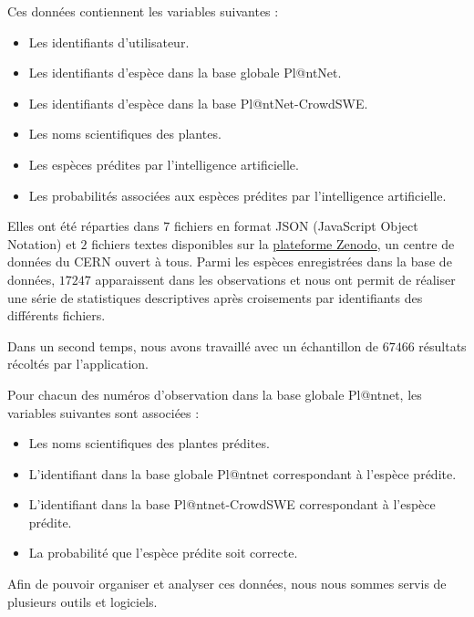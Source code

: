 \documentclass[a4paper,12pt]{article}
\begin{document}
\vspace{0.2cm}

Ces données contiennent les variables suivantes :
\begin{itemize}
    \item Les identifiants d'utilisateur.
    \item Les identifiants d'espèce dans la base globale Pl@ntNet.
    \item Les identifiants d'espèce dans la base Pl@ntNet-CrowdSWE.
    \item Les noms scientifiques des plantes.
    \item Les espèces prédites par l'intelligence artificielle.
    \item Les probabilités associées aux espèces prédites par l'intelligence artificielle.
\end{itemize}

\vspace{0.2cm}

Elles ont été réparties dans $7$ fichiers en format JSON (JavaScript Object Notation) et $2$ fichiers textes disponibles sur la \href{https://zenodo.org/records/10782465}{plateforme Zenodo}, un centre de données du CERN ouvert à tous. Parmi les espèces enregistrées dans la base de données, $17 247$ apparaissent dans les observations et nous ont permit de réaliser une série de statistiques descriptives après croisements par identifiants des différents fichiers. 

\vspace{0.2cm}

Dans un second temps, nous avons travaillé avec un échantillon de $67 466$ résultats récoltés par l'application.

\vspace{0.2cm}

Pour chacun des numéros d'observation dans la base globale Pl@ntnet, les variables suivantes sont associées : 
\begin{itemize}
    \item Les noms scientifiques des plantes prédites.
    \item L'identifiant dans la base globale Pl@ntnet correspondant à l'espèce prédite.
    \item L'identifiant dans la base Pl@ntnet-CrowdSWE correspondant à l'espèce prédite.
    \item La probabilité que l'espèce prédite soit correcte.
\end{itemize}

Afin de pouvoir organiser et analyser ces données, nous nous sommes servis de plusieurs outils et logiciels.
\end{document}
